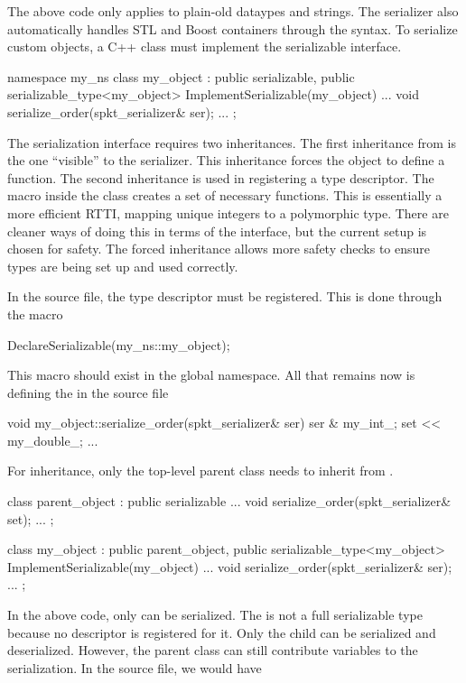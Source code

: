 The above code only applies to plain-old dataypes and strings.
The serializer also automatically handles STL and Boost containers
through the \inlinecode{<<} syntax.
To serialize custom objects, a C++ class must implement the serializable interface.

\begin{CppCode}
namespace my_ns {
class my_object : 
  public serializable,
  public serializable_type<my_object>
{
 ImplementSerializable(my_object)
 ...
 void
 serialize_order(spkt_serializer& ser);
 ...
};
}
\end{CppCode}
The serialization interface requires two inheritances.
The first inheritance from  is the one ``visible'' to the serializer.
This inheritance forces the object to define a  function.
The second inheritance is used in registering a type descriptor.
The macro  inside the class creates a set of necessary functions.
This is essentially a more efficient RTTI, mapping unique integers to a polymorphic type.
There are cleaner ways of doing this in terms of the interface,
but the current setup is chosen for safety.
The forced inheritance allows more safety checks to ensure types are being set up and used correctly.

In the source file, the type descriptor must be registered.
This is done through the macro

\begin{CppCode}
DeclareSerializable(my_ns::my_object);
\end{CppCode}
This macro should exist in the global namespace.
All that remains now is defining the  in the source file

\begin{CppCode}
void
my_object::serialize_order(spkt_serializer& ser)
{
  ser & my_int_;
  set << my_double_;
  ...
}
\end{CppCode}

For inheritance, only the top-level parent class needs to inherit from .

\begin{CppCode}
class parent_object : 
  public serializable
{
...
  void
  serialize_order(spkt_serializer& set);
...
};

class my_object :
  public parent_object,
  public serializable_type<my_object>
{
 ImplementSerializable(my_object)
 ...
 void
 serialize_order(spkt_serializer& ser);
 ...
};
\end{CppCode}
In the above code, only  can be serialized.
The  is not a full serializable type because no descriptor is registered for it.
Only the child can be serialized and deserialized.
However, the parent class can still contribute variables to the serialization.
In the source file, we would have

